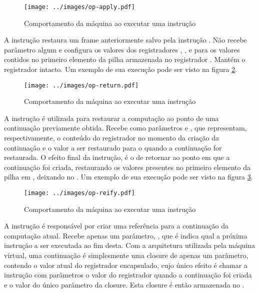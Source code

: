 \begin{figure}[h!]
\centering
\texttt{[image: ../images/op-apply.pdf]}
\caption{Comportamento da máquina ao executar uma instrução }
\label{fig:op-apply}
\end{figure}


A instrução   restaura um frame anteriormente salvo pela instrução
. Não recebe parâmetro algum e configura os valores dos
registradores , ,  e  para
os valores contidos no primeiro elemento da pilha armazenada no registrador
. Mantém o registrador  intacto. Um exemplo de sua
execução pode ser visto na figura \ref{fig:op-return}. 

\begin{figure}[h!]
\centering
\texttt{[image: ../images/op-return.pdf]}
\caption{Comportamento da máquina ao executar uma instrução }
\label{fig:op-return}
\end{figure}


A instrução   é utilizada para restaurar a
computação ao ponto de uma continuação previamente obtida. Recebe como
parâmetros  e , que representam, respectivamente, o
conteúdo do registrador  no momento da criação da continuação e o
valor a ser restaurado para o  quando a continuação for
restaurada. O efeito final da instrução, é o de retornar ao ponto em que a
continuação foi criada, restaurando os valores presentes no primeiro elemento
da pilha em , deixando  no . Um exemplo de sua
execução pode ser visto na figura \ref{fig:op-reify}. 

\begin{figure}[h!]
\centering
\texttt{[image: ../images/op-reify.pdf]}
\caption{Comportamento da máquina ao executar uma instrução }
\label{fig:op-reify}
\end{figure}


A instrução   é responsável por criar uma referência
para a continuação da computação atual. Recebe apenas um parâmetro,
, que é indica qual a próxima instrução a ser executada ao fim
desta. Com a arquitetura utilizada pela máquina virtual, uma continuação é
simplesmente uma closure de apenas um parâmetro, contendo o valor atual do
registrador  encapsulado, cujo único efeito é chamar a instrução
 com parâmetros o valor do registrador  quando a
continuação foi criada e o valor do único parâmetro da closure. Esta closure é
então armazenada no .

